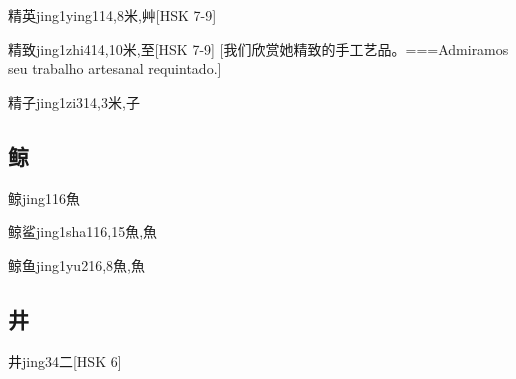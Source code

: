 \begin{EntryWithPhonetic}{精英}{jing1ying1}{14,8}{⽶,⾋}[HSK 7-9]
\end{EntryWithPhonetic}

\begin{EntryWithPhonetic}{精致}{jing1zhi4}{14,10}{⽶,⾄}[HSK 7-9]
  [我们欣赏她精致的手工艺品。===Admiramos seu trabalho artesanal requintado.]
\end{EntryWithPhonetic}

\begin{EntryWithPhonetic}{精子}{jing1zi3}{14,3}{⽶,⼦}
\end{EntryWithPhonetic}

\subsection*{鲸}

\begin{EntryWithPhonetic}{鲸}{jing1}{16}{⿂}
\end{EntryWithPhonetic}

\begin{EntryWithPhonetic}{鲸鲨}{jing1sha1}{16,15}{⿂,⿂}
\end{EntryWithPhonetic}

\begin{EntryWithPhonetic}{鲸鱼}{jing1yu2}{16,8}{⿂,⿂}
\end{EntryWithPhonetic}

\subsection*{井}

\begin{EntryWithPhonetic}{井}{jing3}{4}{⼆}[HSK 6]
\end{EntryWithPhonetic}

